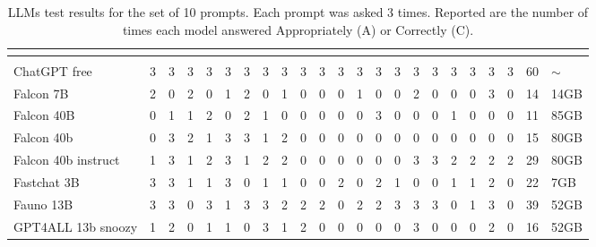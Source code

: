 \begin{table}[!htbp]
    \centering
    \caption{LLMs test results for the set of 10 prompts. Each prompt was asked 3 times. Reported are the number of times each model answered Appropriately (A) or Correctly (C).}
    \label{tab:language-test}
    \setlength{\tabcolsep}{3pt}
        \begin{tabular}{l|rrrrrrrrrrrrrrrrrrrr}
            
            \toprule
              &  &  &  &  &  &  &  &  &  &  \\
            \midrule
             &  &  &  &  &  &  &  &  &  &  &  &  &  &  &  &  &  &  &  &  \\
            \midrule
            ChatGPT free & 3 & 3 & 3 & 3 & 3 & 3 & 3 & 3 & 3 & 3 & 3 & 3 & 3 & 3 & 3 & 3 & 3 & 3 & 3 & 3 & 60 &  $\sim$ \\
            Falcon 7B & 2 & 0 & 2 & 0 & 1 & 2 & 0 & 1 & 0 & 0 & 0 & 1 & 0 & 0 & 2 & 0 & 0 & 0 & 3 & 0  & 14 & 14GB \\
            Falcon 40B & 0 & 1 & 1 & 2 & 0 & 2 & 1 & 0 & 0 & 0 & 0 & 0 & 3 & 0 & 0 & 0 & 1 & 0 & 0 & 0  & 11 & 85GB \\
            Falcon 40b & 0 & 3 & 2 & 1 & 3 & 3 & 1 & 2 & 0 & 0 & 0 & 0 & 0 & 0 & 0 & 0 & 0 & 0 & 0 & 0  & 15 & 80GB \\
            Falcon 40b instruct & 1 & 3 & 1 & 2 & 3 & 1 & 2 & 2 & 0 & 0 & 0 & 0 & 0 & 0 & 3 & 3 & 2 & 2 & 2 & 2 & 29 & 80GB \\
            Fastchat 3B & 3 & 3 & 1 & 1 & 3 & 0 & 1 & 1 & 0 & 0 & 2 & 0 & 2 & 1 & 0 & 0 & 1 & 1 & 2 & 0 & 22 & 7GB \\
            Fauno 13B & 3 & 3 & 0 & 3 & 1 & 3 & 3 & 2 & 2 & 2 & 0 & 2 & 2 & 3 & 3 & 3 & 0 & 1 & 3 & 0 & 39 & 52GB \\
            GPT4ALL 13b snoozy & 1 & 2 & 0 & 1 & 1 & 0 & 3 & 1 & 2 & 0 & 0 & 0 & 0 & 0 & 3 & 0 & 0 & 0 & 2 & 0 & 16 & 52GB \\

\end{tabular}
\end{table}
